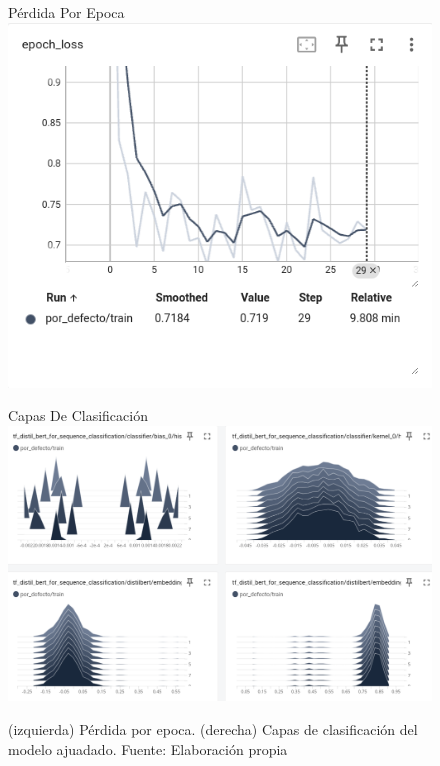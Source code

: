 \begin{enumerate}
\begin{figure}[H]
\begin{minipage}[f]{0.5\textwidth}
  \centering
  Pérdida Por Epoca \\
  \vspace{0.5cm}
  \includegraphics[scale=0.4]{plantilla-libro/img/loss.png}
\end{minipage}
\begin{minipage}[f]{0.5\textwidth}
  \centering 
  Capas De Clasificación \\
  \vspace{0.1cm}
  \includegraphics[scale=0.24]{plantilla-libro/img/capas.png}  
\end{minipage}



  \caption{(izquierda) Pérdida por epoca. (derecha) Capas de clasificación del modelo ajuadado. Fuente: Elaboración propia}
  \label{fig:ajuste-practico}
\end{figure}
      \end{enumerate}
      

